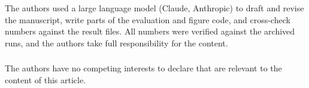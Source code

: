 \documentclass[runningheads]{llncs}
\begin{document}
\begin{credits}
\subsubsection{\ackname}
The authors used a large language model (Claude, Anthropic) to draft and revise
the manuscript, write parts of the evaluation and figure code, and cross-check
numbers against the result files. All numbers were verified against the archived
runs, and the authors take full responsibility for the content.

\subsubsection{\discintname}
The authors have no competing interests to declare that are relevant to the
content of this article.
\end{credits}



\end{document}
